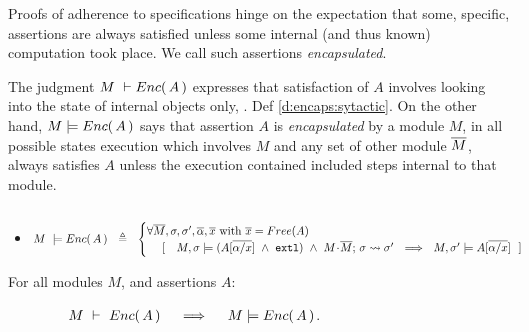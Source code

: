  
Proofs of adherence to {\SpecLang specifications  hinge on the expectation that some,  specific, assertions are always satisfied unless some 
} internal (and thus known) computation took place. 
{We call such assertions   \emph{encapsulated}.}
 

The judgment $M\ \vdash {\ensuremath Enc(\, A\, )}$  expresses that satisfaction of $A$ involves looking into the state of  
internal objects only,  \cf. Def \ref{d:encaps:sytactic}.
{On the other hand, $M  \models {\ensuremath Enc(\, A\, )}$ says that assertion $A$  is  \emph{encapsulated} by a module $M$, \ie in all possible states %
execution which involves $M$ and any set of other module $\overline{M}$, always satisfies  $A$  unless the execution contained included steps internal to that module}.
 

\begin{definition} $~$ \\
\label{d:encaps}
\begin{itemize}
\item
$ %
    M\ \models \encaps{A}\ \   \triangleq  \ \   
    \begin{cases}
     \forall \Mtwo, \sigma, \sigma',  \overline{\alpha}, \overline{x} \mbox{ with } \overline{x}=Free(A)\\ %
   \ \ \ \  [\ \ \  \satisfiesA{M}{\sigma}{({A[{\overline {\alpha/x}}]} \ \wedge\ \externalexec)}\  \wedge\ { \leadstoBounded {M\madd\Mtwo}  {\sigma}{\sigma'}} %
   \ \ \Longrightarrow\ \ 
   {M},{\sigma'}\models{A[{\overline {\alpha/x}}]} \ \  ]
    \end{cases}
 $%
 \end{itemize}
  \end{definition}
  
 
  \begin{lemma}
\label{lem:encap-soundness}
For all modules $M$, and assertions $A$: 

$\strut \hspace{1.5cm} M\ \vdash\ {Enc(\, A\, )} \ \ \ \ \Longrightarrow\ \ \ \ M \models {\ensuremath Enc(\, A\, )}$.
\end{lemma}

